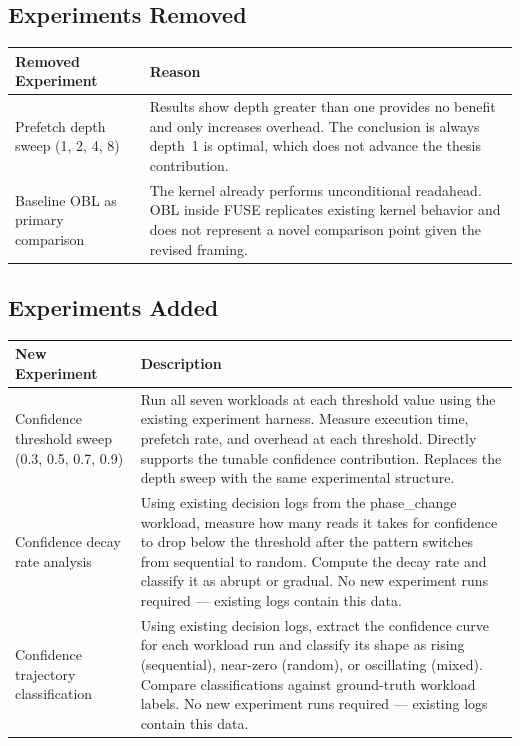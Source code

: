 \documentclass[12pt]{article}
\begin{document}
\subsection*{Experiments Removed}

\begin{tabular}{lp{10cm}}
\toprule
Removed Experiment & Reason \\
\midrule
Prefetch depth sweep (1, 2, 4, 8) &
Results show depth greater than one provides no benefit and only increases
overhead. The conclusion is always depth~1 is optimal, which does not
advance the thesis contribution. \\[0.2in]
Baseline OBL as primary comparison &
The kernel already performs unconditional readahead. OBL inside FUSE
replicates existing kernel behavior and does not represent a novel
comparison point given the revised framing. \\
\bottomrule
\end{tabular}

\subsection*{Experiments Added}

\begin{tabular}{lp{9cm}}
\toprule
New Experiment & Description \\
\midrule
Confidence threshold sweep
(0.3, 0.5, 0.7, 0.9) &
Run all seven workloads at each threshold value using the existing
experiment harness. Measure execution time, prefetch rate, and overhead
at each threshold. Directly supports the tunable confidence contribution.
Replaces the depth sweep with the same experimental structure. \\[0.2in]
Confidence decay rate analysis &
Using existing decision logs from the phase\_change workload, measure
how many reads it takes for confidence to drop below the threshold after
the pattern switches from sequential to random. Compute the decay rate
and classify it as abrupt or gradual. No new experiment runs required ---
existing logs contain this data. \\[0.2in]
Confidence trajectory classification &
Using existing decision logs, extract the confidence curve for each
workload run and classify its shape as rising (sequential), near-zero
(random), or oscillating (mixed). Compare classifications against
ground-truth workload labels. No new experiment runs required ---
existing logs contain this data. \\
\bottomrule
\end{tabular}
\end{document}
